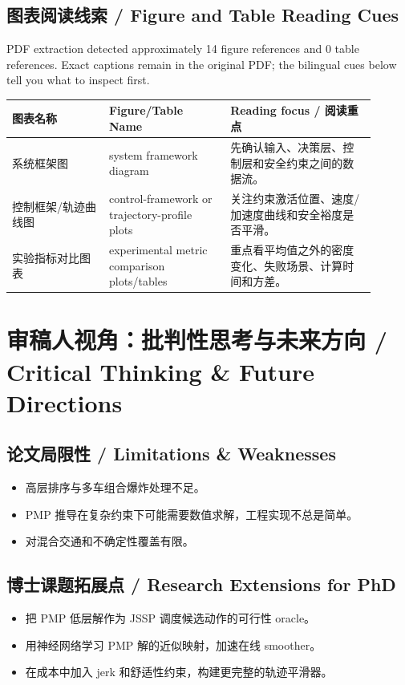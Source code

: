 \documentclass[UTF8,a4paper,11pt,fontset=fandol]{ctexart}
\begin{document}
\subsection{图表阅读线索 / Figure and Table Reading Cues}
PDF extraction detected approximately 14 figure references and 0 table references. Exact captions remain in the original PDF; the bilingual cues below tell you what to inspect first.

\begin{longtable}{p{0.24\linewidth}p{0.30\linewidth}p{0.36\linewidth}}
\toprule
图表名称 & Figure/Table Name & Reading focus / 阅读重点\\
\midrule
系统框架图 & system framework diagram & 先确认输入、决策层、控制层和安全约束之间的数据流。 \\
控制框架/轨迹曲线图 & control-framework or trajectory-profile plots & 关注约束激活位置、速度/加速度曲线和安全裕度是否平滑。 \\
实验指标对比图表 & experimental metric comparison plots/tables & 重点看平均值之外的密度变化、失败场景、计算时间和方差。 \\
\bottomrule
\end{longtable}

\section{审稿人视角：批判性思考与未来方向 / Critical Thinking \& Future Directions}
\subsection{论文局限性 / Limitations \& Weaknesses}
\begin{itemize}
\item 高层排序与多车组合爆炸处理不足。
\item PMP 推导在复杂约束下可能需要数值求解，工程实现不总是简单。
\item 对混合交通和不确定性覆盖有限。
\end{itemize}


\subsection{博士课题拓展点 / Research Extensions for PhD}
\begin{itemize}
\item 把 PMP 低层解作为 JSSP 调度候选动作的可行性 oracle。
\item 用神经网络学习 PMP 解的近似映射，加速在线 smoother。
\item 在成本中加入 jerk 和舒适性约束，构建更完整的轨迹平滑器。
\end{itemize}
\end{document}

